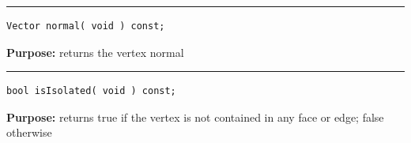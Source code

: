 \documentclass{article}
\begin{document}
\hspace{-.21in}\rule{5in}{1pt}
\begin{verbatim}
Vector normal( void ) const;
\end{verbatim}
\textbf{Purpose:}
returns the vertex normal

\hspace{-.21in}\rule{5in}{1pt}
\begin{verbatim}
bool isIsolated( void ) const;
\end{verbatim}
\textbf{Purpose:}
returns true if the vertex is not contained in any face or edge; false otherwise



\end{document}
